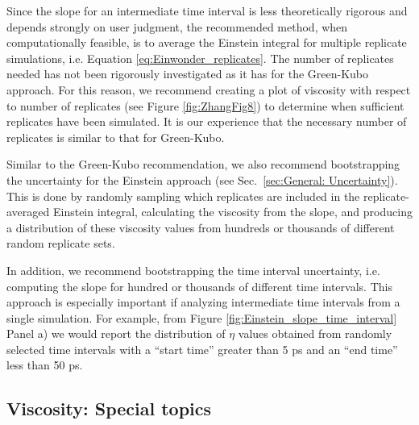 \documentclass[9pt,bestpractices]{livecoms}
\begin{document}


Since the slope for an intermediate time interval is less theoretically rigorous and depends strongly on user judgment, the recommended method, when computationally feasible, is to average the Einstein integral for multiple replicate simulations, i.e. Equation \ref{eq:Einwonder_replicates}. The number of replicates needed has not been rigorously investigated as it has for the Green-Kubo approach. For this reason, we recommend creating a plot of viscosity with respect to number of replicates (see Figure \ref{fig:ZhangFig8}) to determine when sufficient replicates have been simulated. It is our experience that the necessary number of replicates is similar to that for Green-Kubo. 

Similar to the Green-Kubo recommendation, we also recommend bootstrapping the uncertainty for the Einstein approach (see Sec.\ \ref{sec:General: Uncertainty}). This is done by randomly sampling which replicates are included in the replicate-averaged Einstein integral, calculating the viscosity from the slope, and producing a distribution of these viscosity values from hundreds or thousands of different random replicate sets. 

In addition, we recommend bootstrapping the time interval uncertainty, i.e. computing the slope for hundred or thousands of different time intervals. This approach is especially important if analyzing intermediate time intervals from a single simulation. For example, from Figure \ref{fig:Einstein_slope_time_interval} Panel a) we would report the distribution of $\eta$ values obtained from randomly selected time intervals with a ``start time'' greater than 5 ps and an ``end time'' less than 50 ps. 


\subsection{Viscosity: Special topics} \label{sec:Viscosity Special topics}
\end{document}
